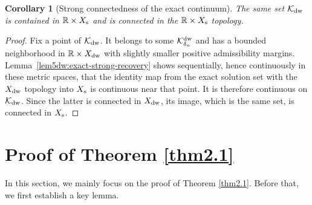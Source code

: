 \documentclass[11pt,reqno]{amsart}
\numberwithin{equation}{section}
\newtheorem{corollary}[theorem]{Corollary}
\theoremstyle{definition}
\theoremstyle{remark}
\begin{document}
\begin{corollary}[Strong connectedness of the exact continuum]
\label{cor:strong-exact-continuum}
The same set $\mathcal K_{\rm dw}$ is contained in
$\mathbb R\times X_{\rm s}$ and is connected in the
$\mathbb R\times X_{\rm s}$ topology.
\end{corollary}
\begin{proof}
Fix a point of $\mathcal K_{\rm dw}$.  It belongs to some
$\mathcal K_{\delta_n}^{\rm dw}$ and has a bounded neighborhood in
$\mathbb R\times X_{\rm dw}$ with slightly smaller positive
admissibility margins.  Lemma~\ref{lem5dw:exact-strong-recovery}
shows sequentially, hence continuously in these metric spaces, that
the identity map from the exact solution set with the
$X_{\rm dw}$ topology into $X_{\rm s}$ is continuous near that
point.  It is therefore continuous on $\mathcal K_{\rm dw}$.
Since the latter is connected in $X_{\rm dw}$, its image, which is
the same set, is connected in $X_{\rm s}$.
\end{proof}



\section{Proof of Theorem \ref{thm2.1}}
In this section, we mainly focus on the proof of Theorem \ref{thm2.1}.
Before that, we first establish a key lemma.
\end{document}
